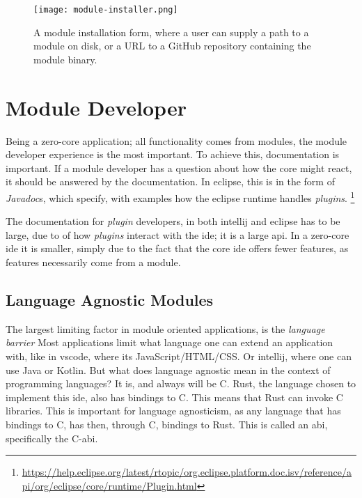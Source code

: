 \begin{figure}
  \centering
  \texttt{[image: module-installer.png]}
  \caption{
    A module installation form, where a user can supply a path to a module on
    disk, or a URL to a GitHub repository containing the module binary.
  }
  \label{pic:moduleInstaller}
\end{figure}

\section{Module Developer}

Being a zero-core application; all functionality comes from modules, the module
developer experience is the most important. To achieve this, documentation is
important. If a module developer has a question about how the core might react,
it should be answered by the documentation. In \gls*{eclipse}, this is in the
form of \textit{Javadoc}s, which specify, with examples how the \gls*{eclipse}
runtime handles \textit{plugins}. \footnote{\url{https://help.eclipse.org/latest/rtopic/org.eclipse.platform.doc.isv/reference/api/org/eclipse/core/runtime/Plugin.html}}

The documentation for \textit{plugin} developers, in both \gls*{intellij} and
\gls*{eclipse} has to be large, due to of how \textit{plugins} interact with the
\gls*{ide}; it is a large \gls*{api}. In a zero-core \gls*{ide} it is smaller,
simply due to the fact that the core \gls*{ide} offers fewer features, as features
necessarily come from a module.

\subsection{Language Agnostic Modules}

The largest limiting factor in module oriented applications, is the
\textit{language barrier} Most applications limit what language one can extend
an application with, like in \gls*{vscode}, where its JavaScript/HTML/CSS. Or
\gls*{intellij}, where one can use Java or Kotlin. But what does language agnostic
mean in the context of programming languages? It is, and always will be C. Rust,
the language chosen to implement this \gls*{ide}, also has bindings to C. This
means that Rust can invoke C libraries. This is important for language
agnosticism, as any language that has bindings to C, has then, through C,
bindings to Rust. This is called an \gls*{abi}, specifically the C-\gls*{abi}.

